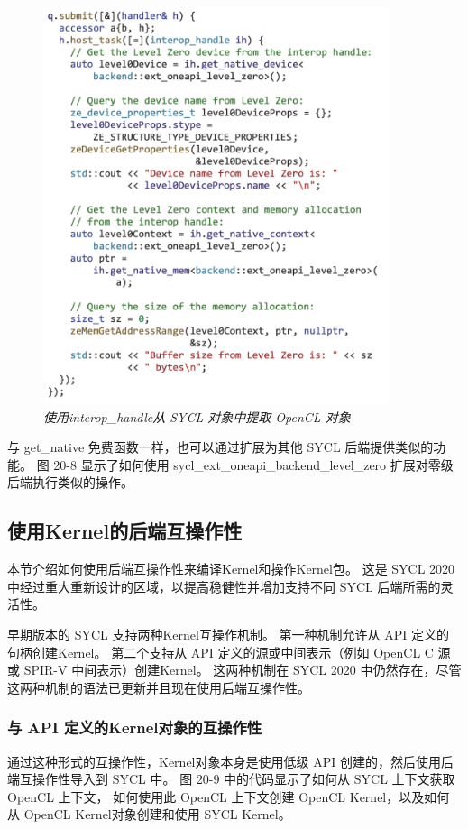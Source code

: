 \begin{figure}[H]
	\centering
	\includegraphics[width=0.9\textwidth]{figs/F20.8.png}
	\caption{\textit{使用interop\_handle从 SYCL 对象中提取 OpenCL 对象 }}
\end{figure}

与 get\_native 免费函数一样，也可以通过扩展为其他 SYCL 后端提供类似的功能。 
图 20-8 显示了如何使用 sycl\_ext\_oneapi\_backend\_level\_zero 扩展对零级后端执行类似的操作。

\subsection{使用Kernel的后端互操作性}
本节介绍如何使用后端互操作性来编译Kernel和操作Kernel包。 
这是 SYCL 2020 中经过重大重新设计的区域，以提高稳健性并增加支持不同 SYCL 后端所需的灵活性。

早期版本的 SYCL 支持两种Kernel互操作机制。 第一种机制允许从 API 定义的句柄创建Kernel。 
第二个支持从 API 定义的源或中间表示（例如 OpenCL C 源或 SPIR-V 中间表示）创建Kernel。 
这两种机制在 SYCL 2020 中仍然存在，尽管这两种机制的语法已更新并且现在使用后端互操作性。

\subsubsection{与 API 定义的Kernel对象的互操作性}
通过这种形式的互操作性，Kernel对象本身是使用低级 API 创建的，然后使用后端互操作性导入到 SYCL 中。 
图 20-9 中的代码显示了如何从 SYCL 上下文获取 OpenCL 上下文，
如何使用此 OpenCL 上下文创建 OpenCL Kernel，以及如何从 OpenCL Kernel对象创建和使用 SYCL Kernel。

